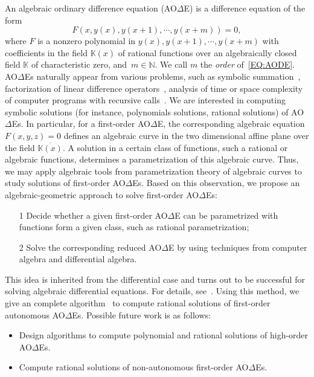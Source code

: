 \documentclass[10pt,a4paper]{article}
\newcommand{\bN}{ {\mathbb  N}}
\newcommand{\bK}{ {\mathbb  K}}
\newcommand{\AODE}{{AO{$\Delta$}E}}
\newcommand{\AODEs}{{AO{$\Delta$}Es}}
\begin{document}
An algebraic ordinary difference equation (\AODE) is a difference equation of the form
\begin{equation} \label{EQ:AODE}
F(x, y(x), y(x + 1), \cdots, y(x + m))=0,
\end{equation}
where $F$ is a nonzero polynomial in $y(x), y(x + 1), \cdots, y(x + m)$ with coefficients in the field $\bK(x)$ of rational functions over an algebraically closed field $\bK$ 
of characteristic zero, and~$m \in \bN$. We call $m$ the \emph{order} of~\eqref{EQ:AODE}. 
{\AODE}s naturally appear from various problems, such as symbolic summation~\cite{PWZbook1996, KoutschanThesis}, 
factorization of linear difference operators~\cite{BronsteinPetkovsek1996}, 
analysis of time or space complexity of computer programs with recursive calls~\cite{Eekelen2018}. 
We are interested in computing symbolic solutions (for instance, polynomials solutions, rational solutions) of {\AODE}s.
In particular, for a first-order {\AODE}, the corresponding algebraic equation $F(x, y, z) = 0$ defines an algebraic curve in the two dimensional affine plane 
over the field $\overline{\mathbb{K}(x)}$. A solution in a certain class of
functions, such a rational or algebraic functions, determines a parametrization of this algebraic curve. 
Thus, we may apply algebraic tools from parametrization theory of algebraic curves to study solutions of first-order {\AODE}s. 
Based on this observation, we propose an algebraic-geometric approach to solve first-order {\AODE}s: 
\begin{itemize}
 \item [1] Decide whether a given first-order {\AODE} can be parametrized with functions form a given class, 
such as rational parametrization;
 \item [2] Solve the corresponding reduced {\AODE} by using techniques from computer algebra 
and differential algebra.
\end{itemize}
This idea is inherited from the differential case and turns out to be successful for solving algebraic 
differential equations. For details, see~\cite{Winkler2019}. 
Using this method, we give an complete algorithm~\cite{VoZhang2019} to compute rational solutions of first-order autonomous {\AODE}s. 
Possible future work is as follows: 

\begin{itemize}
\item  Design algorithms to compute polynomial and rational solutions of high-order \AODEs.
\item Compute rational solutions of non-autonomous first-order \AODEs. 
\end{itemize}	
\end{document}
